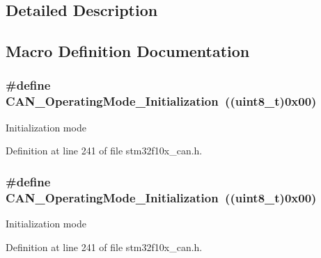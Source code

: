 \subsection{Detailed Description}


\subsection{Macro Definition Documentation}
\subsubsection[{\texorpdfstring{C\+A\+N\+\_\+\+Operating\+Mode\+\_\+\+Initialization}{CAN_OperatingMode_Initialization}}]{\setlength{\rightskip}{0pt plus 5cm}\#define C\+A\+N\+\_\+\+Operating\+Mode\+\_\+\+Initialization~(({\bf uint8\+\_\+t})0x00)}\hypertarget{group___c_a_n___operating___mode_gace8a4b5c164aba6f473d6254ad1e8a36}{}\label{group___c_a_n___operating___mode_gace8a4b5c164aba6f473d6254ad1e8a36}
Initialization mode 

Definition at line 241 of file stm32f10x\+\_\+can.\+h.

\subsubsection[{\texorpdfstring{C\+A\+N\+\_\+\+Operating\+Mode\+\_\+\+Initialization}{CAN_OperatingMode_Initialization}}]{\setlength{\rightskip}{0pt plus 5cm}\#define C\+A\+N\+\_\+\+Operating\+Mode\+\_\+\+Initialization~(({\bf uint8\+\_\+t})0x00)}\hypertarget{group___c_a_n___operating___mode_gace8a4b5c164aba6f473d6254ad1e8a36}{}\label{group___c_a_n___operating___mode_gace8a4b5c164aba6f473d6254ad1e8a36}
Initialization mode 

Definition at line 241 of file stm32f10x\+\_\+can.\+h.

